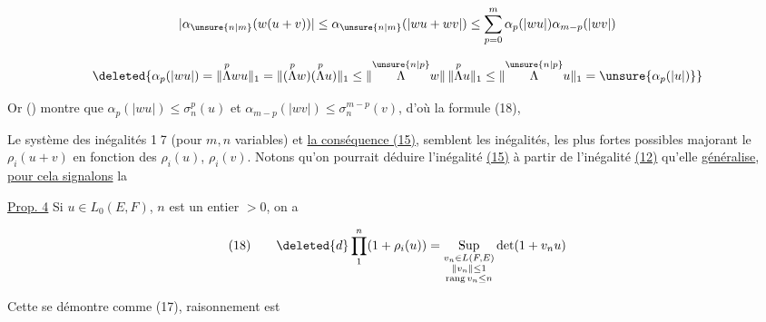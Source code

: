 \[
|\alpha_{\unsure{n|m}}(w(u+v))|\leq\alpha_{\unsure{n|m}}(|wu+wv|)\leq\sum_{p=0}^{m}\alpha_p(|wu|)\alpha_{m-p}(|wv|)
\]


\[
\deleted{\alpha_p(|wu|)=\lVert\overset{p}{\Lambda}wu\rVert_1=\lVert(\overset{p}{\Lambda}w)(\overset{p}{\Lambda}u)\rVert_1\leq\lVert\overset{\unsure{n|p}}{\Lambda}w\rVert\,\lVert\overset{p}{\Lambda}u\rVert_1\leq\lVert\overset{\unsure{n|p}}{\Lambda}u\rVert_1=\unsure{\alpha_p(|u|)}}
\]

 Or () montre que $\alpha_p(|wu|)\leq\sigma_n^p(u)$ et $\alpha_{m-p}(|wv|)\leq\sigma_n^{m-p}(v)$, d'où la formule (18),

Le système des inégalités \textcircled{17} (pour $m,n$ variables) et \uline{la conséquence (15)}, semblent les inégalités, les plus fortes possibles majorant le  $\rho_i(u+v)$ en fonction des $\rho_i(u)$, $\rho_i(v)$. Notons qu'on pourrait déduire   l'inégalité \uline{(15)} à partir de l'inégalité \uline{(12)} qu'elle \uline{généralise}, \uline{pour cela signalons} la 

\uline{Prop. 4} Si $u\in L_0(E,F)$,  $n$ est un entier $>0$, on a

\[
\begin{array}{@{}l@{\qquad}l@{}}
(18) & \displaystyle \deleted{d}\prod_1^n(1+\rho_i(u))=\operatorname*{Sup}_{\substack{v_n\in L(F,E)\\\lVert v_n\rVert\leq1\\\operatorname{rang}v_n\leq n}}\det(1+v_nu)
\end{array}
\]

Cette   se démontre comme (17),   raisonnement est  


